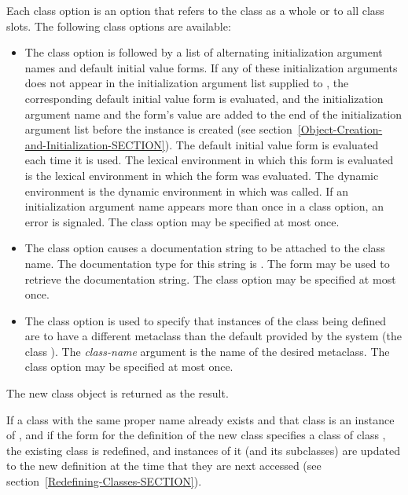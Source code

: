 \begin{defmac}
Each class option is an option that refers to the class as a whole
or to all class slots.  The following class options are available:

\begin{itemize}
\item 
The  class option is followed by a list of
alternating initialization argument names and default initial value
forms.  If any of these initialization arguments does not appear in
the initialization argument list supplied to , the
corresponding default initial value form is evaluated, and the
initialization argument name and the form's value are added to the end
of the initialization argument list before the instance is created
(see section~\ref{Object-Creation-and-Initialization-SECTION}).  The default
initial value form is evaluated each time it is used.  The lexical
environment in which this form is evaluated is the lexical environment
in which the  form was evaluated.  The dynamic
environment is the dynamic environment in which 
was called.  If an initialization argument name appears more than once
in a  class option, an error is signaled.  The
 class option may be specified at most once.


\item  
The  class option causes a documentation string to be
attached to the class name.  The documentation type for this string is
.  The form 
may be used to retrieve the documentation string.  The 
 class option may be specified at most once.

\item 
The  class option is used to specify that instances of the
class being defined are to have a different metaclass than the default
provided by the system (the class ).  The {\it
class-name} argument is the name of the desired metaclass.  The 
 class option may be specified at most once.

\end{itemize}


The new class object is returned as the result.


If a class with the same proper name already exists and that class is
an instance of , and if the  form for
the definition of the new class specifies a class of class 
, the existing class is redefined, and instances of it
(and its subclasses) are updated to the new definition at the time
that they are next accessed (see section~\ref{Redefining-Classes-SECTION}).


\end{defmac}

